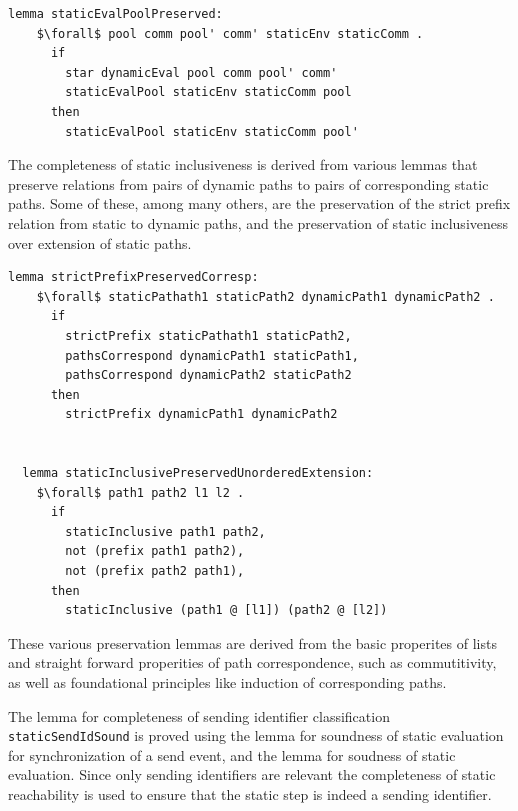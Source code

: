 \documentclass[letterpaper, 11pt]{extarticle}
\begin{document}
\begin{lstlisting}[language=logic, mathescape]
  lemma staticEvalPoolPreserved:
    $\forall$ pool comm pool' comm' staticEnv staticComm .
      if
        star dynamicEval pool comm pool' comm' 
        staticEvalPool staticEnv staticComm pool
      then
        staticEvalPool staticEnv staticComm pool'
\end{lstlisting}

The completeness of static inclusiveness is derived from various lemmas that
preserve relations from pairs of dynamic paths to pairs of corresponding static paths.  
Some of these, among many others, are
the preservation of the strict prefix relation from static to dynamic paths,
and the preservation of static inclusiveness over extension of static paths.

\begin{lstlisting}[language=logic, mathescape]
  lemma strictPrefixPreservedCorresp:
    $\forall$ staticPathath1 staticPath2 dynamicPath1 dynamicPath2 .
      if
        strictPrefix staticPathath1 staticPath2, 
        pathsCorrespond dynamicPath1 staticPath1,
        pathsCorrespond dynamicPath2 staticPath2
      then
        strictPrefix dynamicPath1 dynamicPath2


  lemma staticInclusivePreservedUnorderedExtension:
    $\forall$ path1 path2 l1 l2 .
      if
        staticInclusive path1 path2, 
        not (prefix path1 path2),
        not (prefix path2 path1), 
      then
        staticInclusive (path1 @ [l1]) (path2 @ [l2])
\end{lstlisting}

These various preservation lemmas are derived from the basic properites of lists 
and straight forward properities of path correspondence, such as commutitivity, as
well as foundational principles like induction of corresponding paths.

The lemma for completeness of sending identifier classification \lstinline{staticSendIdSound}
is proved using the lemma for
soundness of static evaluation for synchronization of a send event,
and the lemma for soudness of static evaluation.
Since only sending identifiers are relevant the completeness of static reachability is
used to ensure that the static step is indeed a sending identifier. 
\end{document}
